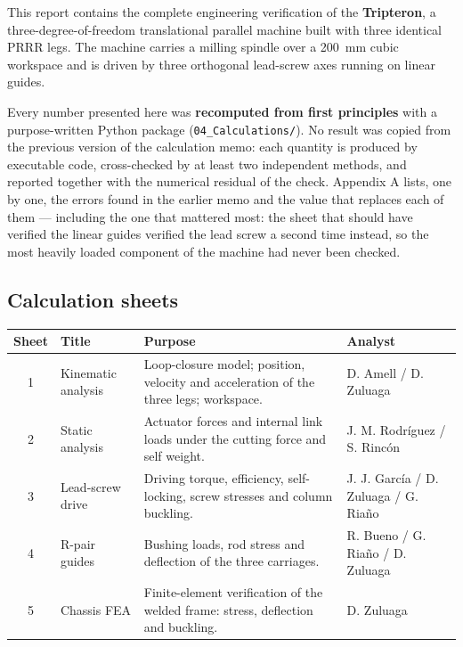 \documentclass[11pt]{article}
\begin{document}
This report contains the complete engineering verification of the \textbf{Tripteron}, a
three-degree-of-freedom translational parallel machine built with three identical
PRRR legs. The machine carries a milling spindle over a \SI{200}{\milli\metre} cubic
workspace and is driven by three orthogonal lead-screw axes running on linear guides.

Every number presented here was \textbf{recomputed from first principles} with a
purpose-written Python package (\texttt{04\_Calculations/}). No result was copied from
the previous version of the calculation memo: each quantity is produced by executable
code, cross-checked by at least two independent methods, and reported together with the
numerical residual of the check. Appendix A lists, one by one, the
errors found in the earlier memo and the value that replaces each of them --- including
the one that mattered most: the sheet that should have verified the linear guides verified
the lead screw a second time instead, so the most heavily loaded component of the machine
had never been checked.

\subsection{Calculation sheets}

\begin{center}
\small
\begin{tabular}{@{}cl>{\raggedright\arraybackslash}p{5.7cm}l@{}}
\toprule
\textbf{Sheet} & \textbf{Title} & \textbf{Purpose} & \textbf{Analyst} \\
\midrule
1 & Kinematic analysis & Loop-closure model; position, velocity and acceleration of the three legs; workspace. & D. Amell / D. Zuluaga \\
2 & Static analysis    & Actuator forces and internal link loads under the cutting force and self weight. & J. M. Rodr\'iguez / S. Rinc\'on \\
3 & Lead-screw drive   & Driving torque, efficiency, self-locking, screw stresses and column buckling. & J. J. Garc\'ia / D. Zuluaga / G. Ria\~no \\
4 & R-pair guides      & Bushing loads, rod stress and deflection of the three carriages. & R. Bueno / G. Ria\~no / D. Zuluaga \\
5 & Chassis FEA        & Finite-element verification of the welded frame: stress, deflection and buckling. & D. Zuluaga \\
\bottomrule
\end{tabular}
\end{center}
\end{document}

